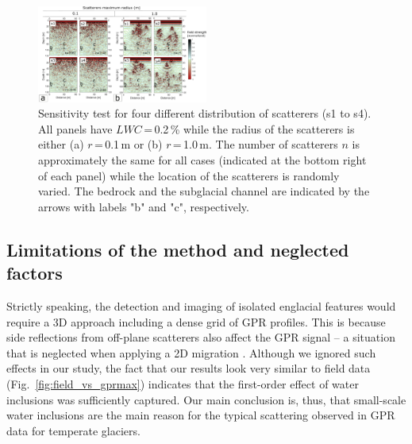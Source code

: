\begin{figure}
    \centering
    \includegraphics[width=0.5\textwidth]{chapters/chapter_gprmax/Fig08.pdf}
    \caption{Sensitivity test for four different distribution of scatterers (s1 to s4). All panels have $LWC$\,=\,0.2\,\% while the radius of the scatterers is either (a) $r$\,=\,0.1\,m  or (b) $r$\,=\,1.0\,m. The number of scatterers $n$ is approximately the same for all cases (indicated at the bottom right of each panel) while the location of the scatterers is randomly varied. The bedrock and the subglacial channel are indicated by the arrows with labels "b" and "c", respectively.}
    \label{fig:sensitivity_rng}
\end{figure}


\subsection{Limitations of the method and neglected factors}

Strictly speaking, the detection and imaging of isolated englacial features would require a 3D approach including a dense grid of GPR profiles. This is because side reflections from off-plane scatterers also affect the GPR signal -- a situation that is neglected when applying a 2D migration \citep[e.g.][]{Barrett&al2008}. Although we ignored such effects in our study, the fact that our results look very similar to field data (Fig.~\ref{fig:field_vs_gprmax}) indicates that the first-order effect of water inclusions was sufficiently captured. Our main conclusion is, thus, that small-scale water inclusions are the main reason for the typical scattering observed in GPR data for temperate glaciers.

